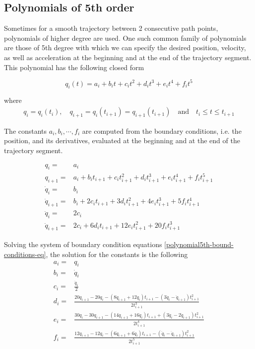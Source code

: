 \subsection{Polynomials of 5th order}
\label{section-polynomials-5}

Sometimes for a smooth trajectory between 2 consecutive path points, polynomials of higher degree are used. One such common family of polynomials are those of 5th degree with which we can specify the desired 
position, velocity, as well as acceleration at the beginning and at the end of the trajectory segment. This polynomial has the following closed form

\begin{equation}
q_i(t) = a_i + b_it + c_it^2 + d_it^3 + e_it^4 + f_it^5
\end{equation}

where
\begin{equation}
\begin{gathered}
q_i = q_i(t_i), \quad q_{i+1} = q_i(t_{i+1}) = q_{i+1}(t_{i+1}) \quad \textrm{and} \quad t_i \leq t \leq t_{i+1}
\end{gathered}
\end{equation}

The constants $a_i, b_i, \cdots, f_i$ are computed from the boundary conditions, i.e. the position, and its derivatives, evaluated at the beginning and at the end of the trajectory segment.

\begin{equation}
\label{polynomial5th-bound-conditions-eq}
\begin{aligned}
q_i ={}& a_i \\
q_{i+1} ={}& a_i + b_it_{i+1} + c_it_{i+1}^2 + d_it_{i+1}^3 + e_it_{i+1}^4 + f_it_{i+1}^5 \\
\dot{q}_i ={}& b_i \\ 
\dot{q}_{i+1} ={}& b_i + 2c_it_{i+1} + 3d_it_{i+1}^2 + 4e_it_{i+1}^3 + 5f_it_{i+1}^4 \\
\ddot{q}_i ={}& 2c_i \\
\ddot{q}_{i+1} ={}& 2c_i + 6d_it_{i+1} + 12e_it_{i+1}^2 + 20f_it_{i+1}^3
\end{aligned}
\end{equation}

Solving the system of boundary condition equations \ref{polynomial5th-bound-conditions-eq}, the solution for the constants is the following
\begin{equation}
\begin{aligned}
a_i ={}& q_i \\
b_i ={}& \dot{q}_i \\
c_i ={}& \frac{\ddot{q}_i}{2} \\
d_i ={}& \frac{20q_{i+1} - 20q_i - (8\dot{q}_{i+1} + 12\dot{q}_i)t_{i+1} - (3\ddot{q}_i - \ddot{q}_{i+1})t_{i+1}^2 }{2t_{i+1}^3} \\
e_i ={}& \frac{30q_i - 30q_{i+1} - (14\dot{q}_{i+1} + 16\dot{q}_i)t_{i+1} + (3\ddot{q}_i - 2\ddot{q}_{i+1})t_{i+1}^2}{2t_{i+1}^4} \\
f_i ={}& \frac{12q_{i+1} - 12q_i - (6\dot{q}_{i+1} + 6\dot{q}_i)t_{i+1} - (\ddot{q}_i - \ddot{q}_{i+1})t_{i+1}^2 }{2t_{i+1}^5}
\end{aligned}
\end{equation}


